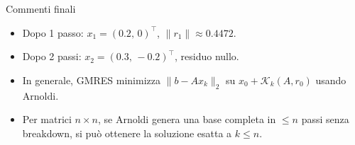 \documentclass{beamer}
\begin{document}
\begin{frame}{Commenti finali}
\begin{itemize}
  \item Dopo 1 passo: $x_1=(0.2,\,0)^\top$, $\|r_1\|\approx 0.4472$.
  \item Dopo 2 passi: $x_2=(0.3,\,-0.2)^\top$, residuo nullo.
  \item In generale, GMRES minimizza $\|b-Ax_k\|_2$ su $x_0+\mathcal{K}_k(A,r_0)$ usando Arnoldi.
  \item Per matrici $n\times n$, se Arnoldi genera una base completa in $\le n$ passi senza breakdown, si può ottenere la soluzione esatta a $k\le n$.
\end{itemize}
\end{frame}
\end{document}
